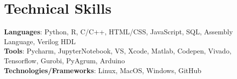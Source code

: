 \documentclass[letterpaper,11pt]{article}
\begin{document}
%
\section{Technical Skills}
 \begin{itemize}[leftmargin=0.15in, label={}]
    \small{\item{
     \textbf{Languages}{: Python, R, C/C++, HTML/CSS, JavaScript, SQL, Assembly Language, Verilog HDL} \\
     \textbf{Tools}{: Pycharm, JupyterNotebook, VS, Xcode, Matlab, Codepen, Vivado, Tensorflow, Gurobi, PyAgrum, Arduino} \\
     \textbf{Technologies/Frameworks}{: Linux, MacOS, Windows, GitHub} \\
    }}
 \end{itemize}
 \vspace{-20pt}


\end{document}
